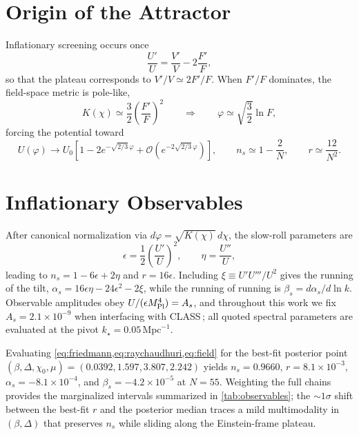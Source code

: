 \documentclass[11pt,a4paper]{article}
\begin{document}
\section{Origin of the Attractor}
\label{sec:origin}
Inflationary screening occurs once
\begin{equation}
\frac{U'}{U}=\frac{V'}{V}-2\frac{F'}{F},
\end{equation}
so that the plateau corresponds to $V'/V\simeq2F'/F$. When $F'/F$ dominates, the field-space metric is pole-like,
\begin{equation}
K(\chi)\simeq\frac{3}{2}\left(\frac{F'}{F}\right)^{2}\qquad\Rightarrow\qquad \varphi\simeq\sqrt{\frac{3}{2}}\ln F,
\end{equation}
forcing the potential toward
\begin{equation}
U(\varphi)\rightarrow U_{0}\left[1-2e^{-\sqrt{2/3}\,\varphi}+\mathcal{O}(e^{-2\sqrt{2/3}\,\varphi})\right], \qquad n_{s}\simeq1-\frac{2}{N}, \qquad r\simeq\frac{12}{N^{2}}.
\end{equation}

\section{Inflationary Observables}
\label{sec:observables}
After canonical normalization via $d\varphi=\sqrt{K(\chi)}\,d\chi$, the slow-roll parameters are
\begin{equation}
\epsilon=\frac{1}{2}\left(\frac{U'}{U}\right)^{2}, \qquad \eta=\frac{U''}{U},
\end{equation}
leading to $n_{s}=1-6\epsilon+2\eta$ and $r=16\epsilon$. Including $\xi \equiv U'U'''/U^{2}$ gives the running of the tilt, $\alpha_{s}=16\epsilon\eta-24\epsilon^{2}-2\xi$, while the running of running is $\beta_{s}=d\alpha_{s}/d\ln k$. Observable amplitudes obey $U/(\epsilon M_{\rm Pl}^{4})=A_{s}$, and throughout this work we fix $A_{s}=2.1\times10^{-9}$ when interfacing with \textsc{CLASS}$\,$; all quoted spectral parameters are evaluated at the pivot $k_{\star}=0.05\,\mathrm{Mpc}^{-1}$.

Evaluating \cref{eq:friedmann,eq:raychaudhuri,eq:field} for the best-fit posterior point $(\beta,\Delta,\chi_{0},\mu)=(0.0392,1.597,3.807,2.242)$ yields $n_s=0.9660$, $r=8.1\times10^{-3}$, $\alpha_s=-8.1\times10^{-4}$, and $\beta_s=-4.2\times10^{-5}$ at $N=55$. Weighting the full chains provides the marginalized intervals summarized in \cref{tab:observables}; the ${\sim}1\sigma$ shift between the best-fit $r$ and the posterior median traces a mild multimodality in $(\beta,\Delta)$ that preserves $n_s$ while sliding along the Einstein-frame plateau.
\end{document}
